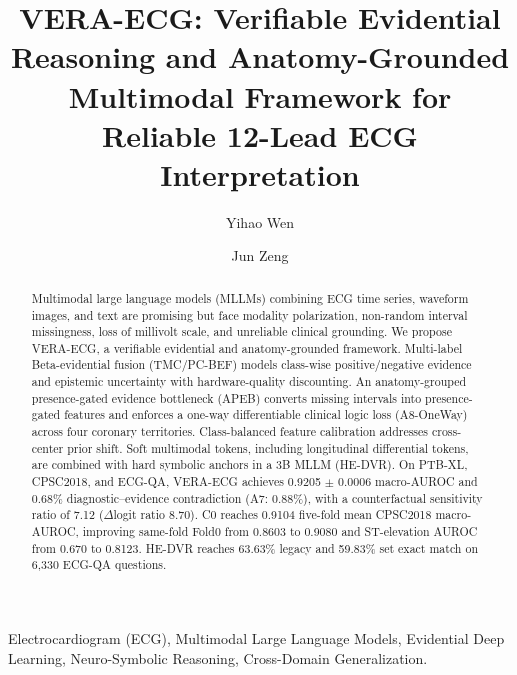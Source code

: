 \documentclass[preprint,12pt]{elsarticle}
\begin{document}
\linenumbers
\modulolinenumbers[1]
\doublespacing
\begin{frontmatter}
\title{VERA-ECG: Verifiable Evidential Reasoning and Anatomy-Grounded Multimodal Framework for Reliable 12-Lead ECG Interpretation}
\author[1]{Yihao Wen}
\author[2]{Jun Zeng}
\begin{abstract}
Multimodal large language models (MLLMs) combining ECG time series, waveform images, and text are promising but face modality polarization, non-random interval missingness, loss of millivolt scale, and unreliable clinical grounding. We propose VERA-ECG, a verifiable evidential and anatomy-grounded framework. Multi-label Beta-evidential fusion (TMC/PC-BEF) models class-wise positive/negative evidence and epistemic uncertainty with hardware-quality discounting. An anatomy-grouped presence-gated evidence bottleneck (APEB) converts missing intervals into presence-gated features and enforces a one-way differentiable clinical logic loss (A8-OneWay) across four coronary territories. Class-balanced feature calibration addresses cross-center prior shift. Soft multimodal tokens, including longitudinal differential tokens, are combined with hard symbolic anchors in a 3B MLLM (HE-DVR). On PTB-XL, CPSC2018, and ECG-QA, VERA-ECG achieves 0.9205 $\pm$ 0.0006 macro-AUROC and 0.68\% diagnostic--evidence contradiction (A7: 0.88\%), with a counterfactual sensitivity ratio of 7.12 ($\Delta$logit ratio 8.70). C0 reaches 0.9104 five-fold mean CPSC2018 macro-AUROC, improving same-fold Fold0 from 0.8603 to 0.9080 and ST-elevation AUROC from 0.670 to 0.8123. HE-DVR reaches 63.63\% legacy and 59.83\% set exact match on 6,330 ECG-QA questions.
\end{abstract}
\begin{keyword}
Electrocardiogram (ECG), Multimodal Large Language Models, Evidential Deep Learning, Neuro-Symbolic Reasoning, Cross-Domain Generalization.
\end{keyword}
\end{frontmatter}
\maketitle
\end{document}

